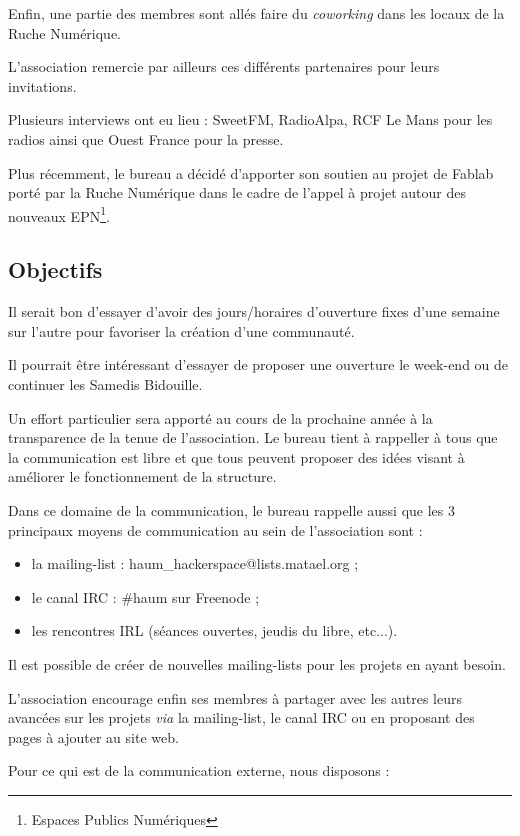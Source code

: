 \documentclass[11pt]{article}
\begin{document}
Enfin, une partie des membres sont allés faire du \textit{coworking} dans les locaux de la Ruche Numérique.

L'association remercie par ailleurs ces différents partenaires pour leurs invitations.

Plusieurs interviews ont eu lieu : SweetFM, RadioAlpa, RCF Le Mans pour les radios ainsi que Ouest France pour la presse.

Plus récemment, le bureau a décidé d'apporter son soutien au projet de Fablab porté par la Ruche Numérique dans le cadre
de l'appel à projet autour des nouveaux EPN\footnote{Espaces Publics Numériques}.

\subsection{Objectifs}

Il serait bon d'essayer d'avoir des jours/horaires d'ouverture fixes d'une semaine sur l'autre pour favoriser la
création d'une communauté.

Il pourrait être intéressant d'essayer de proposer une ouverture le week-end ou de continuer les Samedis Bidouille.

Un effort particulier sera apporté au cours de la prochaine année à la transparence de la tenue de l'association. Le
bureau tient à rappeller à tous que la communication est libre et que tous peuvent proposer des idées visant à améliorer
le fonctionnement de la structure.

Dans ce domaine de la communication, le bureau rappelle aussi que les 3 principaux moyens de communication au sein de
l'association sont :

\begin{itemize}
    \item la mailing-list : haum\_hackerspace@lists.matael.org ;
    \item le canal IRC : \#haum sur Freenode ;
    \item les rencontres IRL (séances ouvertes, jeudis du libre, etc...).
\end{itemize}

Il est possible de créer de nouvelles mailing-lists pour les projets en ayant besoin.

L'association encourage enfin ses membres à partager avec les autres leurs avancées sur les projets \textit{via} la
mailing-list, le canal IRC ou en proposant des pages à ajouter au site web.

Pour ce qui est de la communication externe, nous disposons :
\end{document}
